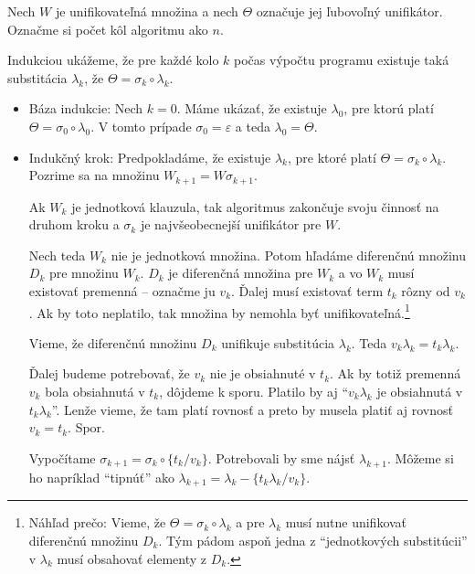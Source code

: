 \begin{dokaz}
    Nech $W$ je unifikovateľná množina a nech $\Theta$ označuje jej
    ľubovoľný unifikátor.
    Označme si počet kôl algoritmu ako $n$.
    
    Indukciou ukážeme, že pre každé kolo $k$ počas výpočtu programu existuje
    taká substitácia $\lambda_k$, že $\Theta = \sigma_k \circ \lambda_k$.

    \begin{itemize}
    \item Báza indukcie: Nech $k = 0$. Máme ukázať, že existuje
    $\lambda_0$, pre ktorú platí $\Theta = \sigma_0 \circ \lambda_0$.
    V tomto prípade $\sigma_0 = \varepsilon$ a teda $\lambda_0 = \Theta$.

    \item Indukčný krok: Predpokladáme, že existuje $\lambda_k$, 
        pre ktoré platí $\Theta = \sigma_k \circ \lambda_k$.
        Pozrime sa na množinu $W_{k+1}= W\sigma_{k+1}$.

        Ak $W_k$ je jednotková klauzula, tak algoritmus zakončuje 
        svoju činnosť na druhom kroku a $\sigma_k$ je
        najvšeobecnejší unifikátor pre $W$. 

        Nech teda $W_k$ nie je jednotková množina.
        Potom hľadáme diferenčnú množinu $D_k$ pre množinu $W_k$. 
        $D_k$ je diferenčná množina pre $W_k$ a 
        vo $W_k$ musí existovať premenná -- označme ju $v_k$. 
        Ďalej musí existovať term $t_k$ rôzny od $v_k$.
        Ak by toto neplatilo, tak množina by nemohla byť
        unifikovateľná.\footnote{Náhľad prečo: Vieme, že
            $\Theta = \sigma_k \circ \lambda_k$ a pre $\lambda_k$ musí
            nutne unifikovať diferenčnú množinu $D_k$. Tým pádom aspoň
            jedna z ``jednotkových substitúcii'' v $\lambda_k$ musí
            obsahovať elementy z $D_k$.
        }

        Vieme, že diferenčnú množinu $D_k$ unifikuje substitúcia $\lambda_k$.
        Teda $v_k \lambda_k = t_k \lambda_k$.

        Ďalej budeme potrebovať, že $v_k$ nie je obsiahnuté v $t_k$.
        Ak by totiž premenná $v_k$ bola obsiahnutá v $t_k$, dôjdeme k sporu.
        Platilo by aj ``$v_k \lambda_k$ je obsiahnutá v 
        $t_k \lambda_k$''. Lenže vieme, že tam platí rovnosť a preto by
        musela platiť aj rovnosť $v_k=t_k$. Spor.

        Vypočítame $\sigma_{k+1}=\sigma_k \circ \{t_k/v_k\}$.
        Potrebovali by sme nájsť $\lambda_{k+1}$. Môžeme si ho
        napríklad ``tipnúť'' ako 
        $\lambda_{k+1} = \lambda_k - \{t_k\lambda_k/v_k\}$. 


\end{itemize}
\end{dokaz}
